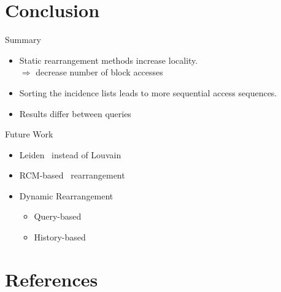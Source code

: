 \documentclass[rgb]{beamer}
\begin{document}
    \section{Conclusion}
        \begin{frame}{Summary}
            \begin{itemize}
                \item Static rearrangement methods increase locality. \\ [0.5em]
                $\Rightarrow$ decrease number of block accesses \\ [3em]
                \item Sorting the incidence lists leads to more sequential access sequences. \\ [3em]
                \item Results differ between queries 
                \end{itemize}
        \end{frame}
    
        \begin{frame}{Future Work}
        \begin{itemize}
            \item Leiden~\autocite{traag2019louvain} instead of Louvain \\ [2em]
            \item RCM-based~\autocite{Cuthill1969ReducingTB} rearrangement \\ [2em]
            \item  Dynamic Rearrangement \\ [1.5em]
                \begin{itemize}
                 \item Query-based \\ [1em]
                 \item History-based 
                \end{itemize}

        \end{itemize}
        \end{frame}
        
\section{References}
    \begin{frame}[allowframebreaks]
    \nocite{*}
      \begin{tiny}
      \printbibliography
      \end{tiny}
    \end{frame}
\end{document}
